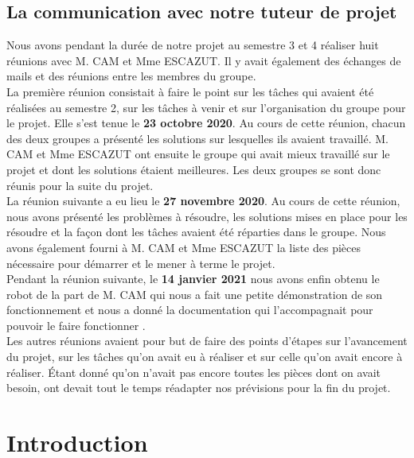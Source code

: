 \documentclass{PackagerQualityN}
\begin{document}
\subsection*{La communication avec notre tuteur de projet}

Nous avons pendant la durée de notre projet au semestre 3 et 4 réaliser huit réunions avec M. CAM et Mme ESCAZUT. Il y avait également des échanges de mails et des réunions entre les membres du groupe.\\

La première réunion consistait à faire le point sur les tâches qui avaient été réalisées au semestre 2, sur les tâches à venir et sur l’organisation du groupe pour le projet. Elle s’est tenue le \textbf{23 octobre 2020}. Au cours de cette réunion, chacun des deux groupes a présenté les solutions sur lesquelles ils avaient travaillé. M. CAM et Mme ESCAZUT ont ensuite le groupe qui avait mieux travaillé sur le projet et dont les solutions étaient meilleures. Les deux groupes se sont donc réunis pour la suite du projet.\\

La réunion suivante a eu lieu le \textbf{27 novembre 2020}. Au cours de cette réunion, nous avons présenté les problèmes à résoudre, les solutions mises en place pour les résoudre et la façon dont les tâches avaient été réparties dans le groupe. Nous avons également fourni à M. CAM et Mme ESCAZUT la liste des pièces nécessaire pour démarrer et le mener à terme le projet. \\

Pendant la réunion suivante, le \textbf{14 janvier 2021} nous avons enfin obtenu le robot de la part de M. CAM qui nous a fait une petite démonstration de son fonctionnement et nous a donné la documentation qui l’accompagnait pour pouvoir le faire fonctionner .\\

Les autres réunions avaient pour but de faire des points d’étapes sur l’avancement du projet, sur les tâches qu’on avait eu à réaliser et sur celle qu’on avait encore à réaliser. Étant donné qu’on n’avait pas encore toutes les pièces dont on avait besoin, ont devait tout le temps réadapter nos prévisions pour la fin du projet.
\newp

\section*{Introduction}
\end{document}
